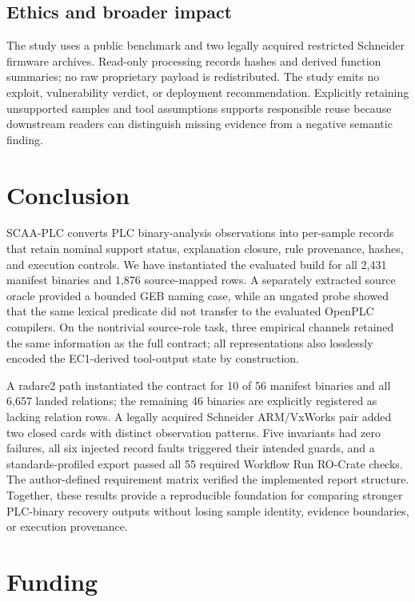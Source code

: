 \documentclass[a4paper,fleqn]{cas-dc}
\begin{document}
\subsection{Ethics and broader impact}

The study uses a public benchmark and two legally acquired restricted Schneider firmware archives. Read-only processing records hashes and derived function summaries; no raw proprietary payload is redistributed. The study emits no exploit, vulnerability verdict, or deployment recommendation. Explicitly retaining unsupported samples and tool assumptions supports responsible reuse because downstream readers can distinguish missing evidence from a negative semantic finding.



\section{Conclusion}

SCAA-PLC converts PLC binary-analysis observations into per-sample records that retain nominal support status, explanation closure, rule provenance, hashes, and execution controls. We have instantiated the evaluated build for all 2{,}431 manifest binaries and 1{,}876 source-mapped rows. A separately extracted source oracle provided a bounded GEB naming case, while an ungated probe showed that the same lexical predicate did not transfer to the evaluated OpenPLC compilers. On the nontrivial source-role task, three empirical channels retained the same information as the full contract; all representations also losslessly encoded the EC1-derived tool-output state by construction.

A radare2 path instantiated the contract for 10 of 56 manifest binaries and all 6{,}657 landed relations; the remaining 46 binaries are explicitly registered as lacking relation rows. A legally acquired Schneider ARM/VxWorks pair added two closed cards with distinct observation patterns. Five invariants had zero failures, all six injected record faults triggered their intended guards, and a standards-profiled export passed all 55 required Workflow Run RO-Crate checks. The author-defined requirement matrix verified the implemented report structure. Together, these results provide a reproducible foundation for comparing stronger PLC-binary recovery outputs without losing sample identity, evidence boundaries, or execution provenance.
\FloatBarrier
\section*{Funding}
\end{document}
